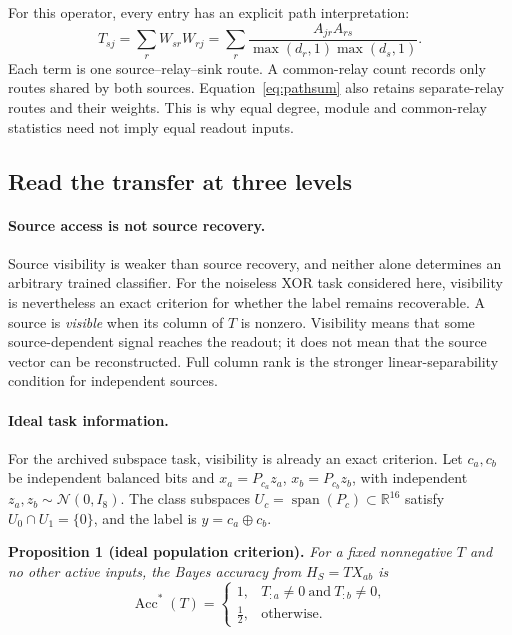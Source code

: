 For this operator, every entry has an explicit path interpretation:
\begin{equation}
 T_{sj}=\sum_r W_{sr}W_{rj}
 =\sum_r\frac{A_{jr}A_{rs}}{\max(d_r,1)\max(d_s,1)}.
 \label{eq:pathsum}
\end{equation}
Each term is one source--relay--sink route. A common-relay count records
only routes shared by both sources. Equation~\eqref{eq:pathsum} also retains
separate-relay routes and their weights. This is why equal degree, module
and common-relay statistics need not imply equal readout inputs.

\subsection{Read the transfer at three levels}
\label{sec:observability}

\paragraph{Source access is not source recovery.}
Source visibility is weaker than source recovery, and neither alone determines an arbitrary trained classifier. For the noiseless XOR task considered here, visibility is nevertheless an exact criterion for whether the label remains recoverable. A source is \emph{visible} when its column of $T$ is nonzero. Visibility
means that some source-dependent signal reaches the readout; it does not
mean that the source vector can be reconstructed. Full column rank is
the stronger linear-separability condition for independent sources.

\paragraph{Ideal task information.}
For the archived subspace task, visibility is already an exact criterion.
Let $c_a,c_b$ be independent balanced bits and
$x_a=P_{c_a}z_a$, $x_b=P_{c_b}z_b$, with independent
$z_a,z_b\sim\mathcal N(0,I_8)$. The class subspaces
$U_c=\operatorname{span}(P_c)\subset\mathbb R^{16}$ satisfy
$U_0\cap U_1=\{0\}$, and the label is $y=c_a\oplus c_b$.

\noindent\textbf{Proposition 1 (ideal population criterion).}
\emph{For a fixed nonnegative $T$ and no other active inputs, the Bayes
accuracy from $H_S=TX_{ab}$ is}
\begin{equation}
 \operatorname{Acc}^{*}(T)=
 \begin{cases}
  1, & T_{:a}\ne0\ \text{and}\ T_{:b}\ne0,\\
  \tfrac12, & \text{otherwise}.
 \end{cases}
 \label{eq:criterion}
\end{equation}

